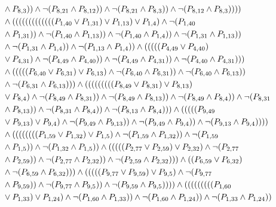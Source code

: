 \documentclass[10pt]{article}
\begin{document}
\begin{align*}
& \land \PV{8,3})) \land \lnot(\PV{8,21} \land \PV{8,12})) \land \lnot(\PV{8,21} \land \PV{8,3})) \land \lnot(\PV{8,12} \land \PV{8,3})))) \\
& \land (((((((((((((\PV{1,40} \lor \PV{1,31}) \lor \PV{1,13}) \lor \PV{1,4}) \land \lnot(\PV{1,40} \\
& \land \PV{1,31})) \land \lnot(\PV{1,40} \land \PV{1,13})) \land \lnot(\PV{1,40} \land \PV{1,4})) \land \lnot(\PV{1,31} \land \PV{1,13})) \\
& \land \lnot(\PV{1,31} \land \PV{1,4})) \land \lnot(\PV{1,13} \land \PV{1,4})) \land (((((\PV{4,49} \lor \PV{4,40}) \\
& \lor \PV{4,31}) \land \lnot(\PV{4,49} \land \PV{4,40})) \land \lnot(\PV{4,49} \land \PV{4,31})) \land \lnot(\PV{4,40} \land \PV{4,31}))) \\
& \land (((((\PV{6,40} \lor \PV{6,31}) \lor \PV{6,13}) \land \lnot(\PV{6,40} \land \PV{6,31})) \land \lnot(\PV{6,40} \land \PV{6,13})) \\
& \land \lnot(\PV{6,31} \land \PV{6,13}))) \land (((((((((\PV{8,49} \lor \PV{8,31}) \lor \PV{8,13}) \\
& \lor \PV{8,4}) \land \lnot(\PV{8,49} \land \PV{8,31})) \land \lnot(\PV{8,49} \land \PV{8,13})) \land \lnot(\PV{8,49} \land \PV{8,4})) \land \lnot(\PV{8,31} \\
& \land \PV{8,13})) \land \lnot(\PV{8,31} \land \PV{8,4})) \land \lnot(\PV{8,13} \land \PV{8,4}))) \land (((((\PV{9,49} \\
& \lor \PV{9,13}) \lor \PV{9,4}) \land \lnot(\PV{9,49} \land \PV{9,13})) \land \lnot(\PV{9,49} \land \PV{9,4})) \land \lnot(\PV{9,13} \land \PV{9,4})))) \\
& \land ((((((((\PV{1,59} \lor \PV{1,32}) \lor \PV{1,5}) \land \lnot(\PV{1,59} \land \PV{1,32})) \land \lnot(\PV{1,59} \\
& \land \PV{1,5})) \land \lnot(\PV{1,32} \land \PV{1,5})) \land (((((\PV{2,77} \lor \PV{2,59}) \lor \PV{2,32}) \land \lnot(\PV{2,77} \\
& \land \PV{2,59})) \land \lnot(\PV{2,77} \land \PV{2,32})) \land \lnot(\PV{2,59} \land \PV{2,32}))) \land ((\PV{6,59} \lor \PV{6,32}) \\
& \land \lnot(\PV{6,59} \land \PV{6,32}))) \land (((((\PV{9,77} \lor \PV{9,59}) \lor \PV{9,5}) \land \lnot(\PV{9,77} \\
& \land \PV{9,59})) \land \lnot(\PV{9,77} \land \PV{9,5})) \land \lnot(\PV{9,59} \land \PV{9,5})))) \land (((((((((\PV{1,60} \\
& \lor \PV{1,33}) \lor \PV{1,24}) \land \lnot(\PV{1,60} \land \PV{1,33})) \land \lnot(\PV{1,60} \land \PV{1,24})) \land \lnot(\PV{1,33} \land \PV{1,24})) \\

\end{align*}
\end{document}
